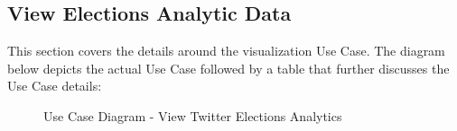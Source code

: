 \documentclass[12pt]{article} %
\begin{document}
    \subsection{View Elections Analytic Data}
    
    This section covers the details around the visualization Use Case. The diagram below depicts the actual Use Case followed by a table that further discusses the Use Case details:
    
    	\begin{figure}[H] %
    		\caption{Use Case Diagram - View Twitter Elections Analytics}
    		\label{fig:speciation}
    	\end{figure}
    	
\end{document}

